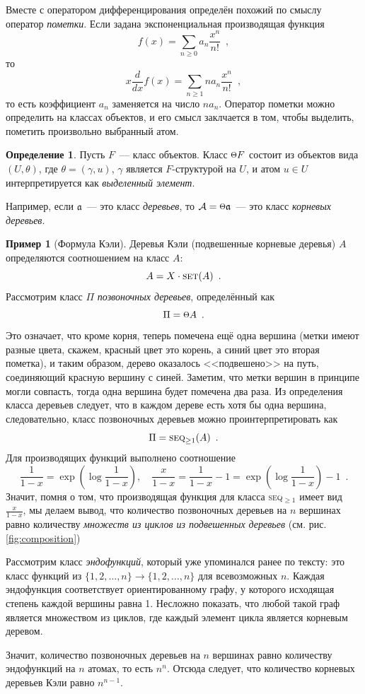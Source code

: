 \documentclass[a5paper]{article}
\def \point {\raisebox{.1\height}{\scalebox{0.8}{$\Theta$}}}
\theoremstyle{definition}
\newtheorem{example}{Пример}
\newtheorem*{definition}{Определение}
\begin{document}
Вместе с оператором дифференцирования определён похожий по смыслу оператор
\textit{пометки}. Если задана экспоненциальная производящая функция
\[
    f(x) = \sum_{n \geq 0} a_n \dfrac{x^n}{n!} \enspace ,
\]
то
\[
    x \dfrac{d}{dx} f(x) = \sum_{n \geq 1} n a_n \dfrac{x^n}{n!} \enspace ,
\]
то есть коэффициент \( a_n \) заменяется на число \( n a_n \). Оператор пометки
можно определить на классах объектов, и его смысл заклчается в том, чтобы
выделить, пометить произвольно выбранный атом.
\begin{definition}
    Пусть \( F \)~--- класс объектов. Класс \( \point F \) состоит из объектов
вида \( (U, \theta) \), где \( \theta = (\gamma, u) \), \( \gamma \) является \(
F \)-структурой на \( U \), и атом \(u \in U \) интерпретируется как
\textit{выделенный элемент}.
\end{definition}

Например, если \( \mathfrak a \)~--- это класс \textit{деревьев}, то \(\mathcal A =
\point \mathfrak a \)~--- это класс \textit{корневых деревьев}.

\begin{example}[Формула Кэли]
    Деревья Кэли (подвешенные корневые деревья) \( A \) определяются соотношением на класс \( A \):
\[
    A = X \cdot \text{\textsc{set}}(A) \enspace .
\]
Рассмотрим класс \( \Pi \) \textit{позвоночных деревьев}, определённый как
\[
    \Pi = \point A \enspace .               
\]
Это означает, что кроме корня, теперь помечена ещё одна вершина 
(метки имеют разные цвета, скажем, красный цвет это корень, а синий цвет это
вторая пометка), и таким образом, дерево
оказалось <<подвешено>> на путь, соединяющий красную вершину с синей. Заметим,
что метки вершин в принципе могли совпасть, тогда одна вершина будет помечена
два раза. Из
определения класса деревьев следует, что в каждом дереве есть хотя бы одна
вершина, следовательно, класс позвоночных деревьев можно проинтерпретировать как
\[
    \Pi = \text{\textsc{seq}}_{\geq 1} (A) \enspace .
\]
Для производящих функций выполнено соотношение
\[
    \dfrac{1}{1-x} = \exp \left(
        \log \dfrac{1}{1 - x}
    \right), \quad
    \dfrac{x}{1-x} = \dfrac{1}{1 -x} - 1 =  \exp \left(
        \log \dfrac{1}{1 - x}
    \right) - 1 \enspace .
\]
Значит, помня о том, что производящая функция для класса \textsc{seq}$_{\geq 1}$
имеет вид \(\frac{x}{1-x}\), мы делаем вывод, что количество позвоночных
деревьев на \( n \) вершинах равно количеству \textit{множеств из циклов из
подвешенных деревьев} (см. рис. \ref{fig:composition})

Рассмотрим класс \textit{эндофункций}, который уже упоминался ранее по тексту:
это класс функций из \( \{ 1, 2, \ldots, n \} \to \{1, 2, \ldots, n\} \) для
всевозможных \( n \). Каждая эндофункция соответствует ориентированному графу, у
которого исходящая степень каждой вершины равна 1. Несложно показать, что любой
такой граф является множеством из циклов, где каждый элемент цикла является
корневым деревом.

Значит, количество позвоночных деревьев на \( n \) вершинах равно количеству
эндофункций на \( n \) атомах, то есть \( n^n \). Отсюда следует, что количество корневых деревьев
Кэли равно \( n^{n-1} \).
\end{example}
\end{document}
